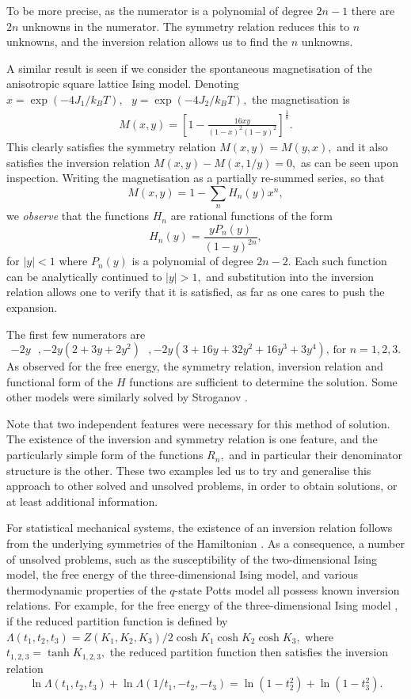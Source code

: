 To be more precise, as the numerator is a polynomial of degree
$2n-1$ there are $2n$ unknowns in the numerator. The
symmetry relation reduces this to $n$ unknowns, and the inversion
relation allows us to find the $n$ unknowns.

A similar result is seen if we consider the spontaneous magnetisation
of the anisotropic square lattice Ising model. Denoting $x = \exp(-4J_1/k_BT),
\mbox{   } y=\exp(-4J_2/k_BT),$ the magnetisation is \cite{Chg}
\begin{eqnarray}
M(x,y) = [1 - \frac{16xy}{(1-x)^2(1-y)^2}]^\frac{1}{8}. \label{mag}
\end{eqnarray}
This clearly satisfies the symmetry relation $M(x,y)=M(y,x),$ and
it also satisfies the inversion relation $M(x,y) - M(x,1/y) = 0,$ as
can be seen upon inspection. Writing the magnetisation as a partially
re-summed series, so that 
$$M(x,y) = 1 - \sum_n H_n(y)x^n,$$ we {\em observe} that the functions $H_n$
are rational functions of the form
$$H_n(y) = \frac{yP_n(y)}{(1 - y)^{2n}}, $$
for $|y| < 1$ where $P_n(y)$ is a polynomial of degree $2n-2.$
Each such function can be analytically continued to $|y| > 1,$ 
and substitution into the inversion relation allows one to verify that
it is satisfied, as far as one cares to push the expansion.

The first few numerators are
$$-2y\mbox{  },-2y(2+3y+2y^2)\mbox{  },-2y(3+16y+32y^2+16y^3+3y^4)\mbox{, for } 
 n=1,2,3.$$
As observed for the free energy, the symmetry relation, inversion
relation and functional form of the $H$ functions are sufficient
to determine the solution.
Some other models were similarly solved by Stroganov \cite{strog79}.

Note that two independent features were necessary for this method of
solution. The existence of the inversion and symmetry relation is
one feature,
and the particularly simple form of the functions $R_n,$ and in
particular their denominator structure is the other. These two examples
led us to try and generalise this approach to other solved and
unsolved problems, in order to obtain solutions, or at least 
additional information.

For statistical mechanical systems, the existence of an inversion
relation follows from the underlying symmetries of the Hamiltonian
\cite{strog79, Bax80, Bax82,Jaek82,Mail84}. As a consequence, a
number of unsolved problems, such as the susceptibility of the
two-dimensional Ising model, the free energy of the three-dimensional
Ising model, and various thermodynamic properties of the $q$-state Potts
model \cite{Jaek82}  all possess known inversion relations.
For example, for the free energy of the three-dimensional
Ising model \cite{Jaek82b}, if the reduced partition function is defined by
$\Lambda(t_1,t_2,t_3) = Z(K_1,K_2,K_3)/2\cosh K_1\cosh K_2\cosh K_3,$
where $t_{1,2,3} =\tanh K_{1,2,3},$ the reduced partition function
then satisfies the inversion relation
$$\ln \Lambda(t_1,t_2,t_3) + \ln \Lambda(1/t_1,-t_2,-t_3) = \ln(1 - t_2^2) +
\ln(1 - t_3^2).$$

